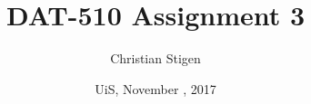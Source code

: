 \documentclass[a4paper,english,12pt]{article}
\title{DAT-510 Assignment 3}
\author{Christian Stigen}
\date{UiS, November \nth{6}, 2017}
\begin{document}
\maketitle

\begin{abstract}
\end{abstract}



\end{document}
